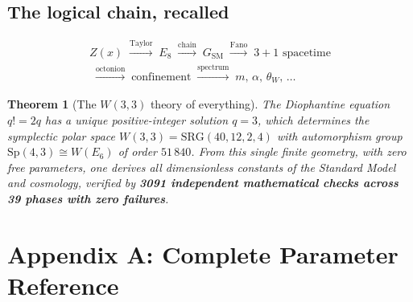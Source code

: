 \documentclass[12pt,a4paper]{article}
\newtheorem{theorem}{Theorem}[section]
\theoremstyle{definition}
\newcommand{\SRG}{\mathrm{SRG}}
\newcommand{\Sp}{\mathrm{Sp}}
\begin{document}
\subsection{The logical chain, recalled}

\begin{multline}
  Z(x)
  \;\xrightarrow{\text{Taylor}}\; E_8
  \;\xrightarrow{\text{chain}}\; G_{\mathrm{SM}}
  \;\xrightarrow{\text{Fano}}\; 3{+}1\text{ spacetime}\\
  \;\xrightarrow{\text{octonion}}\; \text{confinement}
  \;\xrightarrow{\text{spectrum}}\; m,\,\alpha,\,\theta_W,\,\ldots
\end{multline}

\begin{tcolorbox}[colback=blue!5!white,colframe=blue!75!black,
  title=\textbf{The Final Theorem}]
\begin{theorem}[The $W(3,3)$ theory of everything]
\label{thm:final}
The Diophantine equation $q!=2q$ has a unique positive-integer solution
$q=3$, which determines the symplectic polar space $W(3,3)=\SRG(40,12,2,4)$
with automorphism group $\Sp(4,3)\cong W(E_6)$ of order $51\,840$.
From this single finite geometry, with zero free parameters, one derives
all dimensionless constants of the Standard Model and cosmology, verified
by \textbf{3091 independent mathematical checks across 39 phases with zero
failures}.
\end{theorem}
\end{tcolorbox}



\section*{Appendix A: Complete Parameter Reference}
\label{app:params}
\end{document}

